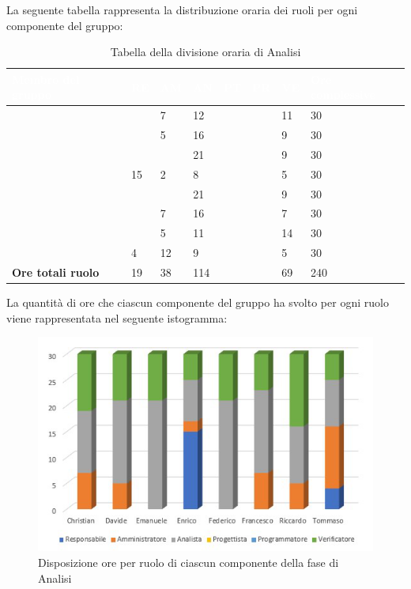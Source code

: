 La seguente tabella rappresenta la distribuzione oraria dei ruoli per ogni componente del gruppo:
{
\renewcommand{\arraystretch}{2}

\centering

\begin{longtable}[h!] { C{4cm} C{1cm} C{1cm} C{1cm} C{1cm} C{1cm} C{1cm} C{3cm}}
\caption{Tabella della divisione oraria di Analisi}	\\
	\textcolor{white}{\textbf{Membro del gruppo}} & 
	\textcolor{white}{\textbf{RE}} & 
	\textcolor{white}{\textbf{AM}} & 
	\textcolor{white}{\textbf{AN}} & 
	\textcolor{white}{\textbf{PT}} & 
	\textcolor{white}{\textbf{PR}} & 
	\textcolor{white}{\textbf{VE}} & 
	\textcolor{white}{\textbf{Ore complessive}}\\	
\endhead        

        \MC{}     &  & 7 & 12 &  & & 11 & 30 \\
		\LD{}       &  & 5 & 16 &  &  & 9 & 30 \\
        \CE{}     &  &  & 21 &  &  & 9 & 30 \\
        \SE{}       & 15 & 2 & 8  &  &  & 5 & 30 \\
        \PF{}       &  &  & 21 &  &  & 9 & 30 \\
        \DF{}      &  & 7 & 16 &  &  & 7 & 30 \\
        \BR{}     &  & 5 & 11 &  &  & 14 & 30 \\
       \AT{}      & 4 & 12 & 9  &  &  & 5 & 30 \\
        \textbf{Ore totali ruolo} & 19 & 38 & 114 &  &  & 69 & 240 \\
        
\end{longtable}
}

La quantità di ore che ciascun componente del gruppo ha svolto per ogni ruolo viene rappresentata nel seguente istogramma:
\begin{figure}[h]
	\centering	
	\includegraphics[scale=2.60]{Sezioni/Istogrammi/IstogrammaAnalisi.png}
	\caption{Disposizione ore per ruolo di ciascun componente della fase di Analisi}
\end{figure}

